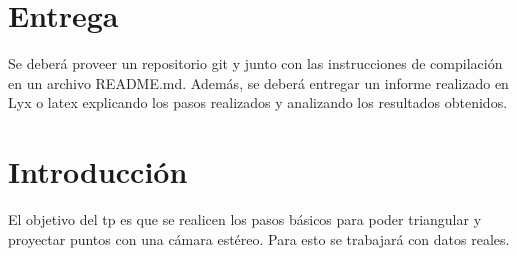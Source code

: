 \documentclass[tp]{lcc}
\begin{document}
\maketitle

\section{Entrega}
Se deberá proveer un repositorio git y junto con las instrucciones de compilación en un archivo README.md.
Además, se deberá entregar un informe realizado en Lyx o latex explicando los pasos realizados y analizando los resultados obtenidos.

\section{Introducción}

El objetivo del tp es que se realicen los pasos básicos para poder triangular y proyectar puntos con una cámara estéreo. 
Para esto se trabajará con datos reales.


\printbibliography
\end{document}
